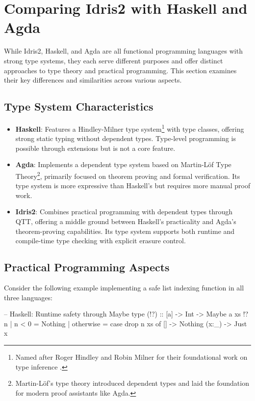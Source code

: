 \documentclass[]{rptuseminar}
\begin{document}
\section{Comparing Idris2 with Haskell and Agda}  
While Idris2, Haskell, and Agda are all functional programming languages with strong type systems, they each serve different purposes and offer distinct approaches to type theory and practical programming. This section examines their key differences and similarities across various aspects.  

\subsection{Type System Characteristics}  
\begin{itemize}  
    \item \textbf{Haskell}: Features a Hindley-Milner type system\footnote{Named after Roger Hindley and Robin Milner for their foundational work on type inference \cite{hindley1969principal,milner1978theory}.} with type classes, offering strong static typing without dependent types. Type-level programming is possible through extensions but is not a core feature.  
    
    \item \textbf{Agda}: Implements a dependent type system based on Martin-Löf Type Theory\footnote{Martin-Löf's type theory \cite{martin1984intuitionistic} introduced dependent types and laid the foundation for modern proof assistants like Agda.}, primarily focused on theorem proving and formal verification. Its type system is more expressive than Haskell's but requires more manual proof work.  
    
    \item \textbf{Idris2}: Combines practical programming with dependent types through QTT, offering a middle ground between Haskell's practicality and Agda's theorem-proving capabilities. Its type system supports both runtime and compile-time type checking with explicit erasure control.  
\end{itemize}  

\subsection{Practical Programming Aspects}  
Consider the following example implementing a safe list indexing function in all three languages:  

\begin{haskell}
-- Haskell: Runtime safety through Maybe type  
(!?) :: [a] -> Int -> Maybe a  
xs !? n | n < 0     = Nothing  
        | otherwise = case drop n xs of  
                       []     -> Nothing  
                       (x:_)  -> Just x  
\end{haskell}
\end{document}
